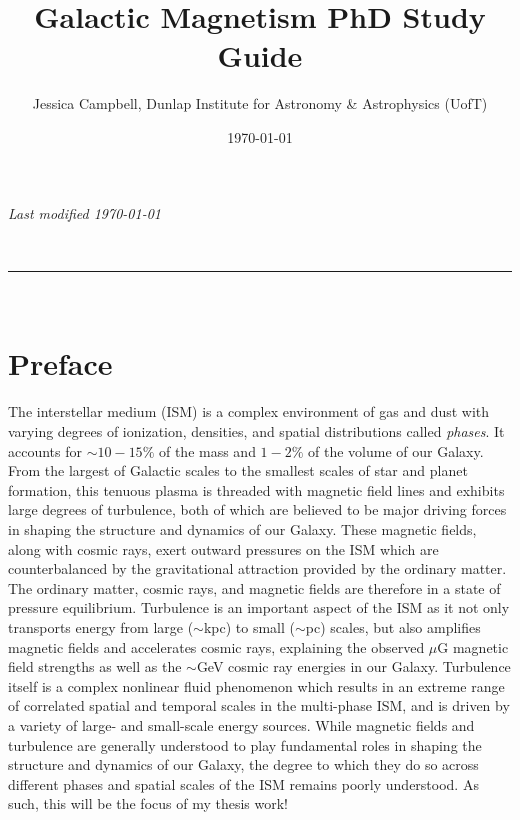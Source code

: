 \documentclass[a4paper,11pt]{article}
\makeatletter
\newcommand{\linia}{\rule{\linewidth}{0.5pt}}
\renewcommand{\maketitle}{
\begin{center}
\vspace{2ex}
{\huge \textsc{\@title}}
\vspace{1ex}
\\
\linia\\
\@author
\vspace{4ex}
\end{center}
}
\makeatother
\begin{document}
\hfill{\textit{Last modified \today}}
\title{Galactic Magnetism PhD Study Guide}
\author{Jessica Campbell, Dunlap Institute for Astronomy \& Astrophysics (UofT)}
\date{\today}
\maketitle
\tableofcontents


\section{Preface}

The interstellar medium (ISM) is a complex environment of gas and dust with varying degrees of ionization, densities, and spatial distributions called \textit{phases}. It accounts for $\sim10-15\%$ of the mass and $1-2\%$ of the volume of our Galaxy. From the largest of Galactic scales to the smallest scales of star and planet formation, this tenuous plasma is threaded with magnetic field lines and exhibits large degrees of turbulence, both of which are believed to be major driving forces in shaping the structure and dynamics of our Galaxy. These magnetic fields, along with cosmic rays, exert outward pressures on the ISM which are counterbalanced by the gravitational attraction provided by the ordinary matter. The ordinary matter, cosmic rays, and magnetic fields are therefore in a state of pressure equilibrium. Turbulence is an important aspect of the ISM as it not only transports energy from large ($\sim$kpc) to small ($\sim$pc) scales, but also amplifies magnetic fields and accelerates cosmic rays, explaining the observed $\mu$G magnetic field strengths as well as the $\sim$GeV cosmic ray energies in our Galaxy. Turbulence itself is a complex nonlinear fluid phenomenon which results in an extreme range of correlated spatial and temporal scales in the multi-phase ISM, and is driven by a variety of large- and small-scale energy sources. While magnetic fields and turbulence are generally understood to play fundamental roles in shaping the structure and dynamics of our Galaxy, the degree to which they do so across different phases and spatial scales of the ISM remains poorly understood. As such, this will be the focus of my thesis work!
\end{document}
